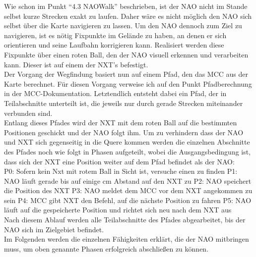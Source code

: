 Wie schon im Punkt ``4.3 NAOWalk'' beschrieben, ist der NAO nicht im Stande selbst kurze Strecken exakt zu laufen. Daher wäre es nicht möglich den NAO sich selbst über die Karte navigieren zu lassen. 
Um den NAO dennoch zum Ziel zu navigieren, ist es nötig Fixpunkte im Gelände zu haben, an denen er sich orientieren und seine Laufbahn korrigieren kann.
Realisiert werden diese Fixpunkte über einen roten Ball, den der NAO visuell erkennen und verarbeiten kann. Dieser ist auf einem der NXT's befestigt.
\\
Der Vorgang der Wegfindung basiert nun auf einem Pfad, den das MCC aus der Karte berechnet. Für diesen Vorgang verweise ich auf den Punkt Pfadberechnung in der MCC-Dokumentation.
Letztendlich entsteht dabei ein Pfad, der in Teilabschnitte unterteilt ist, die jeweils nur durch gerade Strecken miteinander verbunden sind.
\\
Entlang dieses Pfades wird der NXT mit dem roten Ball auf die bestimmten Positionen geschickt und der NAO folgt ihm.
Um zu verhindern dass der NAO und NXT sich gegenseitig in die Quere kommen werden die einzelnen Abschnitte des Pfades noch wie folgt in Phasen aufgeteilt, wobei die Ausgangsbedingung ist, dass sich der NXT eine Position weiter auf dem Pfad befindet als der NAO:
\\
P0: Sofern kein Nxt mit rotem Ball in Sicht ist, versuche einen zu finden
P1: NAO läuft gerade bis auf einige cm Abstand auf den NXT zu
P2: NAO speichert die Position des NXT
P3: NAO meldet dem MCC vor dem NXT angekommen zu sein
P4: MCC gibt NXT den Befehl, auf die nächste Position zu fahren
P5: NAO läuft auf die gespeicherte Position und richtet sich neu nach dem NXT aus
\\
Nach diesem Ablauf werden alle Teilabschnitte des Pfades abgearbeitet, bis der NAO sich im Zielgebiet befindet.
\\
Im Folgenden werden die einzelnen Fähigkeiten erklärt, die der NAO mitbringen muss, um oben genannte Phasen erfolgreich abschließen zu können.
\\
\\
